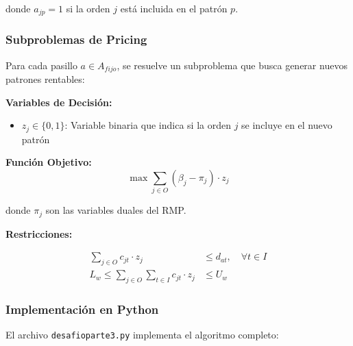 \documentclass[a4paper,12pt]{article}
\begin{document}
donde $a_{jp} = 1$ si la orden $j$ está incluida en el patrón $p$.

\subsubsection{Subproblemas de Pricing}

Para cada pasillo $a \in A_{fijo}$, se resuelve un subproblema que busca generar nuevos patrones rentables:

\textbf{Variables de Decisión:}
\begin{itemize}
    \item $z_j \in \{0,1\}$: Variable binaria que indica si la orden $j$ se incluye en el nuevo patrón
\end{itemize}

\textbf{Función Objetivo:}
\begin{equation}
\max \sum_{j \in O} (\beta_j - \pi_j) \cdot z_j
\end{equation}

donde $\pi_j$ son las variables duales del RMP.

\textbf{Restricciones:}

\begin{align}
\sum_{j \in O} c_{jt} \cdot z_j &\leq d_{at}, \quad \forall t \in I \label{eq:aisle_capacity} \\
L_w \leq \sum_{j \in O} \sum_{t \in I} c_{jt} \cdot z_j &\leq U_w \label{eq:wave_limits_subproblem}
\end{align}

\subsubsection{Implementación en Python}

El archivo \texttt{desafioparte3.py} implementa el algoritmo completo:
\end{document}
